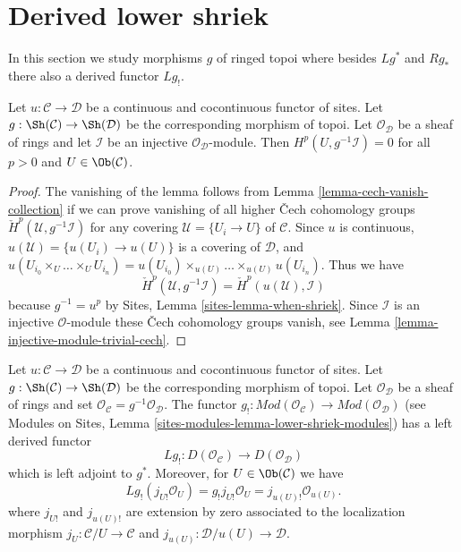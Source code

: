 \section{Derived lower shriek}
\label{section-derived-lower-shriek}

\noindent
In this section we study morphisms $g$ of ringed topoi where besides
$Lg^*$ and $Rg_*$ there also a derived functor $Lg_!$.

\begin{lemma}
\label{lemma-pullback-injective-pre-limp}
Let $u : \mathcal{C} \to \mathcal{D}$ be a continuous and cocontinuous
functor of sites. Let $g : \Sh(\mathcal{C}) \to \Sh(\mathcal{D})$
be the corresponding morphism of topoi. Let $\mathcal{O}_\mathcal{D}$
be a sheaf of rings and let $\mathcal{I}$ be an injective
$\mathcal{O}_\mathcal{D}$-module. Then
$H^p(U, g^{-1}\mathcal{I}) = 0$ for all $p > 0$ and $U \in \Ob(\mathcal{C})$.
\end{lemma}

\begin{proof}
The vanishing of the lemma follows from
Lemma \ref{lemma-cech-vanish-collection}
if we can prove vanishing of all higher
{\v C}ech cohomology groups
$\check H^p(\mathcal{U}, g^{-1}\mathcal{I})$
for any covering $\mathcal{U} = \{U_i \to U\}$ of $\mathcal{C}$.
Since $u$ is continuous, $u(\mathcal{U}) = \{u(U_i) \to u(U)\}$
is a covering of $\mathcal{D}$, and
$u(U_{i_0} \times_U \ldots \times_U U_{i_n}) =
u(U_{i_0}) \times_{u(U)} \ldots \times_{u(U)} u(U_{i_n})$.
Thus we have
$$
\check H^p(\mathcal{U}, g^{-1}\mathcal{I}) =
\check H^p(u(\mathcal{U}), \mathcal{I})
$$
because $g^{-1} = u^p$ by Sites, Lemma \ref{sites-lemma-when-shriek}.
Since $\mathcal{I}$ is an injective
$\mathcal{O}$-module these {\v C}ech cohomology groups vanish, see
Lemma \ref{lemma-injective-module-trivial-cech}.
\end{proof}

\begin{lemma}
\label{lemma-existence-derived-lower-shriek}
Let $u : \mathcal{C} \to \mathcal{D}$ be a continuous and cocontinuous
functor of sites. Let $g : \Sh(\mathcal{C}) \to \Sh(\mathcal{D})$ be the
corresponding morphism of topoi. Let $\mathcal{O}_\mathcal{D}$
be a sheaf of rings and set
$\mathcal{O}_\mathcal{C} = g^{-1}\mathcal{O}_\mathcal{D}$.
The functor $g_! : \textit{Mod}(\mathcal{O}_\mathcal{C}) \to
\textit{Mod}(\mathcal{O}_\mathcal{D})$
(see
Modules on Sites, Lemma \ref{sites-modules-lemma-lower-shriek-modules})
has a left derived functor
$$
Lg_! : D(\mathcal{O}_\mathcal{C}) \longrightarrow D(\mathcal{O}_\mathcal{D})
$$
which is left adjoint to $g^*$. Moreover, for $U \in \Ob(\mathcal{C})$ we
have
$$
Lg_!(j_{U!}\mathcal{O}_U) =
g_!j_{U!}\mathcal{O}_U =
j_{u(U)!} \mathcal{O}_{u(U)}.
$$
where $j_{U!}$ and $j_{u(U)!}$ are extension by zero associated to the
localization morphism
$j_U : \mathcal{C}/U \to \mathcal{C}$ and
$j_{u(U)} : \mathcal{D}/u(U) \to \mathcal{D}$.
\end{lemma}


